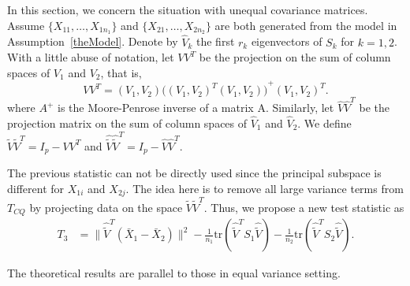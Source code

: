 \documentclass[review]{elsarticle}
\theoremstyle{plain}
\theoremstyle{definition}
\theoremstyle{remark}
\begin{document}
In this section, we concern the situation with unequal covariance matrices.
Assume $\{X_{11},\ldots, X_{1n_1}\}$ and $\{X_{21},\ldots, X_{2n_2}\}$ are both generated from the model in Assumption~\ref{theModel}.
Denote by $\hat{V}_k$ the first $r_k$ eigenvectors of $S_k$ for $k=1,2$.
With a little abuse of notation, let $VV^T$ be the projection on the sum of column spaces of $V_1$ and $V_2$, that is,
\begin{equation*}
    VV^T =(V_1,V_2){\big({(V_1,V_2)}^T (V_1,V_2)\big)}^{+}{(V_1,V_2)}^T.
\end{equation*}
where $A^{+}$ is the Moore-Penrose inverse of a matrix A. Similarly, let $\hat{V}\hat{V}^T$ be the projection matrix on the sum of column spaces of $\hat{V}_1$ and $\hat{V}_2$.
 We define $\tilde{V}\tilde{V}^T=I_{p}-VV^T$ and $\hat{\tilde{V}}\hat{\tilde{V}}^T=I_{p}-\hat{V}\hat{V}^T$. 

The previous statistic can not be directly used
since the principal subspace is different for $X_{1i}$ and $X_{2j}$. The idea here is to remove all large variance terms from $T_{CQ}$ by projecting data on the space $\tilde{V}\tilde{V}^T$. Thus, we propose a new test statistic as
\begin{equation*}
\begin{aligned}
    T_3&=\|\hat{\tilde{V}}^T(\bar{X}_1-\bar{X}_2)\|^2-\frac{1}{n_1}\mathrm{tr}(\hat{\tilde{V}}^T S_1\hat{\tilde{V}})-\frac{1}{n_2}\mathrm{tr}(\hat{\tilde{V}}^T S_2\hat{\tilde{V}}).
\end{aligned}
\end{equation*}


The theoretical results are parallel to those in equal variance setting.

\end{document}
